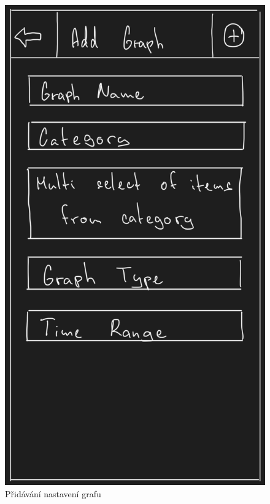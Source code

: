 \documentclass[12pt, titlepage]{article}
\begin{document}
\begin{figure}[ht]
	\centering
	\includegraphics[scale=0.43]{add_graph}
	\caption{Přidávání nastavení grafu}
	\label{fig:add_graph}
\end{figure}
\end{document}
